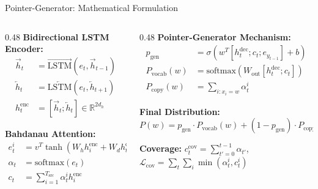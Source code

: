 \documentclass[10pt, aspectratio=169]{beamer}
\begin{document}
\begin{frame}{Pointer-Generator: Mathematical Formulation}
  \begin{columns}[T]
    \begin{column}{0.48\textwidth}
      \textbf{Bidirectional LSTM Encoder:}
      \begin{align}
        \overrightarrow{h}_t &= \overrightarrow{\text{LSTM}}(e_t, \overrightarrow{h}_{t-1}) \nonumber \\
        \overleftarrow{h}_t &= \overleftarrow{\text{LSTM}}(e_t, \overleftarrow{h}_{t+1}) \nonumber \\
        h_t^{\text{enc}} &= [\overrightarrow{h}_t; \overleftarrow{h}_t] \in \mathbb{R}^{2d_h} \nonumber
      \end{align}

      \textbf{Bahdanau Attention:}
      \begin{align}
        e_t^i &= v^T \tanh(W_h h_i^{\text{enc}} + W_d h_t^{\text{dec}} + b) \nonumber \\
        \alpha_t &= \text{softmax}(e_t) \nonumber \\
        c_t &= \sum_{i=1}^{T_{\text{src}}} \alpha_t^i h_i^{\text{enc}} \nonumber
      \end{align}
    \end{column}
    \begin{column}{0.48\textwidth}
      \textbf{Pointer-Generator Mechanism:}
      \begin{align}
        p_{\text{gen}} &= \sigma(w^T [h_t^{\text{dec}}; c_t; e_{y_{t-1}}] + b) \nonumber \\
        P_{\text{vocab}}(w) &= \text{softmax}(W_{\text{out}}[h_t^{\text{dec}}; c_t]) \nonumber \\
        P_{\text{copy}}(w) &= \sum_{i:x_i=w} \alpha_t^i \nonumber
      \end{align}

      \textbf{Final Distribution:}
      \begin{equation}
        \boxed{P(w) = p_{\text{gen}} \cdot P_{\text{vocab}}(w) + (1-p_{\text{gen}}) \cdot P_{\text{copy}}(w)} \nonumber
      \end{equation}

      \textbf{Coverage:}
      $c_t^{\text{cov}} = \sum_{t'=0}^{t-1} \alpha_{t'}$, \;
      $\mathcal{L}_{\text{cov}} = \sum_t \sum_i \min(\alpha_t^i, c_t^i)$
    \end{column}
  \end{columns}
\end{frame}
\end{document}
